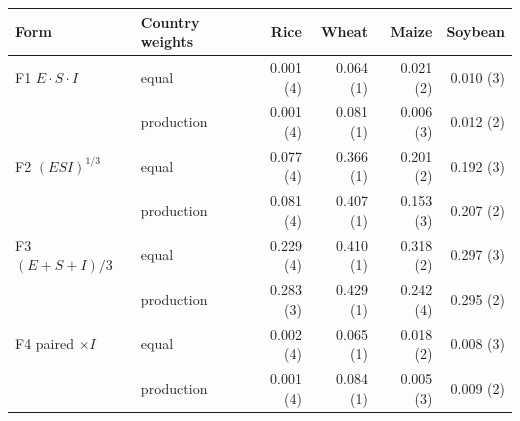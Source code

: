 \begin{tabular}{llrrrr}
\toprule
Form & Country weights & Rice & Wheat & Maize & Soybean\\
\midrule
F1 $E\cdot S\cdot I$ & equal & 0.001 (4) & 0.064 (1) & 0.021 (2) & 0.010 (3) \\
 & production & 0.001 (4) & 0.081 (1) & 0.006 (3) & 0.012 (2) \\
F2 $(E S I)^{1/3}$ & equal & 0.077 (4) & 0.366 (1) & 0.201 (2) & 0.192 (3) \\
 & production & 0.081 (4) & 0.407 (1) & 0.153 (3) & 0.207 (2) \\
F3 $(E+S+I)/3$ & equal & 0.229 (4) & 0.410 (1) & 0.318 (2) & 0.297 (3) \\
 & production & 0.283 (3) & 0.429 (1) & 0.242 (4) & 0.295 (2) \\
F4 paired $\times I$ & equal & 0.002 (4) & 0.065 (1) & 0.018 (2) & 0.008 (3) \\
 & production & 0.001 (4) & 0.084 (1) & 0.005 (3) & 0.009 (2) \\
\bottomrule
\end{tabular}
